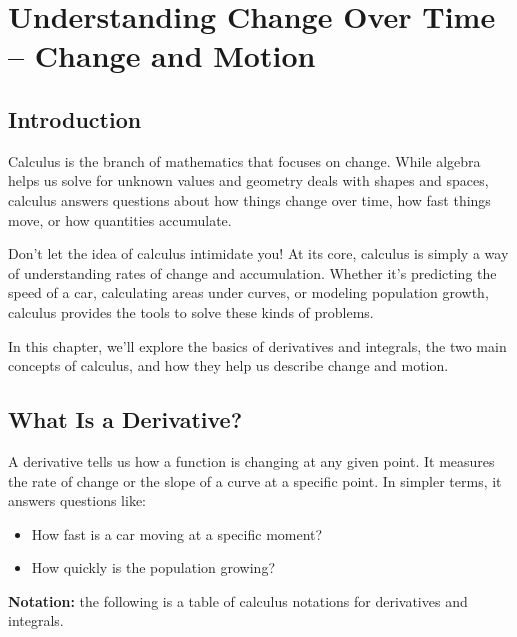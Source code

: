 \chapter{Understanding Change Over Time – Change and Motion}

\section{Introduction}
Calculus is the branch of mathematics that focuses on change. While algebra helps us solve for unknown values and geometry deals with shapes and spaces, calculus answers questions about how things change over time, how fast things move, or how quantities accumulate.

Don’t let the idea of calculus intimidate you! At its core, calculus is simply a way of understanding rates of change and accumulation. Whether it’s predicting the speed of a car, calculating areas under curves, or modeling population growth, calculus provides the tools to solve these kinds of problems.

In this chapter, we’ll explore the basics of derivatives and integrals, the two main concepts of calculus, and how they help us describe change and motion.

\section{What Is a Derivative?}
A derivative tells us how a function is changing at any given point. It measures the rate of change or the slope of a curve at a specific point. In simpler terms, it answers questions like:
\begin{itemize}
    \item How fast is a car moving at a specific moment?
    \item How quickly is the population growing?
\end{itemize}

\textbf{Notation:} the following is a table of calculus notations for derivatives and integrals.

